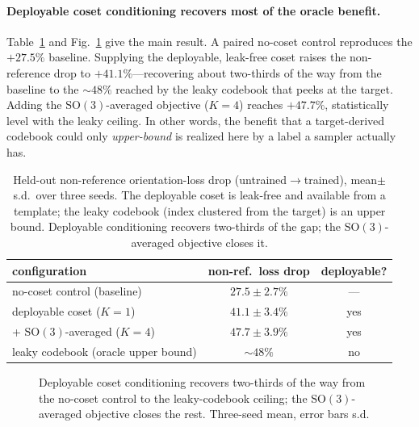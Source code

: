 \documentclass{article}
\begin{document}
\paragraph{Deployable coset conditioning recovers most of the oracle benefit.}
\label{sec:gate}
Table~\ref{tab:gate} and Fig.~\ref{fig:gate} give the main result. A paired
no-coset control reproduces the $+27.5\%$ baseline. Supplying the deployable,
leak-free coset raises the non-reference drop to $+41.1\%$---recovering about
two-thirds of the way from the baseline to the $\sim\!48\%$ reached by the leaky
codebook that peeks at the target. Adding the $\mathrm{SO}(3)$-averaged objective
($K{=}4$) reaches $+47.7\%$, statistically level with the leaky ceiling. In other
words, the benefit that a target-derived codebook could only \emph{upper-bound}
is realized here by a label a sampler actually has.

\begin{table}[t]
\centering
\caption{Held-out non-reference orientation-loss drop (untrained$\to$trained),
mean$\pm$s.d.\ over three seeds. The deployable coset is leak-free and available
from a template; the leaky codebook (index clustered from the target) is an
upper bound. Deployable conditioning recovers two-thirds of the gap; the
$\mathrm{SO}(3)$-averaged objective closes it.}
\label{tab:gate}
\begin{tabular}{lcc}
\toprule
configuration & non-ref.\ loss drop & deployable? \\
\midrule
no-coset control (baseline)         & $27.5\pm2.7\%$ & --- \\
deployable coset ($K{=}1$)          & $41.1\pm3.4\%$ & yes \\
\quad + $\mathrm{SO}(3)$-averaged ($K{=}4$) & $47.7\pm3.9\%$ & yes \\
leaky codebook (oracle upper bound) & $\sim48\%$      & no  \\
\bottomrule
\end{tabular}
\end{table}

\begin{figure}[t]
\centering
{}
\caption{Deployable coset conditioning recovers two-thirds of the way from the
no-coset control to the leaky-codebook ceiling; the $\mathrm{SO}(3)$-averaged
objective closes the rest. Three-seed mean, error bars s.d.}
\label{fig:gate}
\end{figure}
\end{document}
